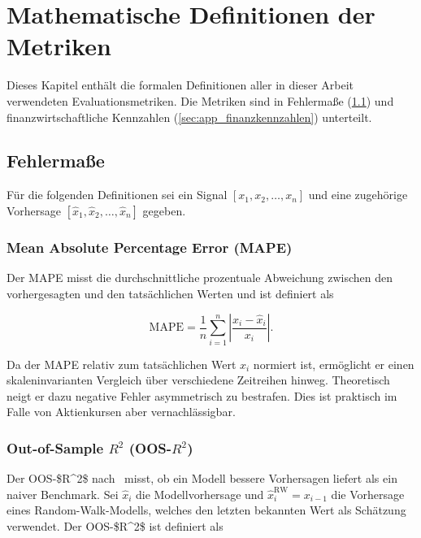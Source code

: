 \appendix
{}
\chapter{Mathematische Definitionen der Metriken}\label{app:metriken}

Dieses Kapitel enthält die formalen Definitionen aller in dieser Arbeit verwendeten Evaluationsmetriken. Die Metriken sind in Fehlermaße (\cref{sec:app_fehlermasse}) und finanzwirtschaftliche Kennzahlen (\cref{sec:app_finanzkennzahlen}) unterteilt.

\section{Fehlermaße}\label{sec:app_fehlermasse}

Für die folgenden Definitionen sei ein Signal \( [x_1, x_2, \dots, x_n] \) und eine zugehörige Vorhersage \( [\hat{x}_1, \hat{x}_2, \dots, \hat{x}_n] \) gegeben.

\subsection*{Mean Absolute Percentage Error (MAPE)}

Der \ac{MAPE} misst die durchschnittliche prozentuale Abweichung zwischen den vorhergesagten und den tatsächlichen Werten und ist definiert als

\[
    \mathrm{MAPE} = \frac{1}{n}\sum_{i=1}^{n}\left|\frac{x_i - \hat{x}_i}{x_i}\right|.
\]

Da der \ac{MAPE} relativ zum tatsächlichen Wert $x_i$ normiert ist, ermöglicht er einen skaleninvarianten Vergleich über verschiedene Zeitreihen hinweg. Theoretisch neigt er dazu negative Fehler asymmetrisch zu bestrafen. Dies ist praktisch im Falle von Aktienkursen aber vernachlässigbar.

\subsection*{Out-of-Sample $R^2$ (OOS-$R^2$)}

Der \ac{OOS-$R^2$} nach~\cite{campbell2008predicting} misst, ob ein Modell bessere Vorhersagen liefert als ein naiver Benchmark. Sei $\hat{x}_i$ die Modellvorhersage und $\hat{x}^{\text{RW}}_i = x_{i-1}$ die Vorhersage eines Random-Walk-Modells, welches den letzten bekannten Wert als Schätzung verwendet. Der \ac{OOS-$R^2$} ist definiert als

